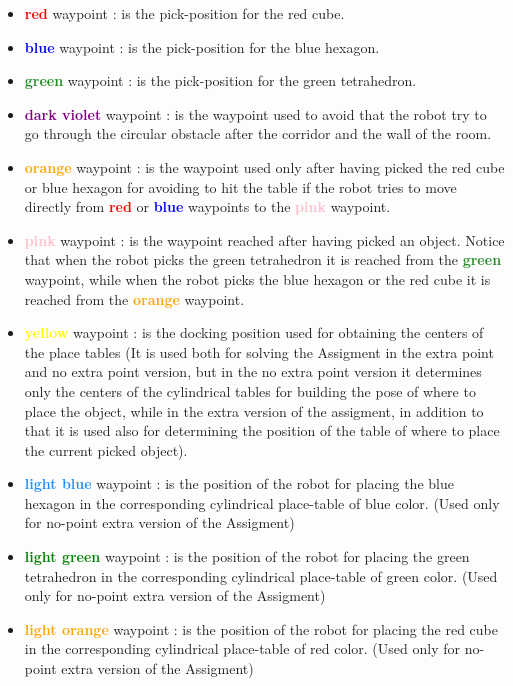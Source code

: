 \begin{itemize}
    \item \textbf{\textcolor{red}{red}} waypoint : is the pick-position for the red cube.
    \item \textbf{\textcolor{blue}{blue}} waypoint : is the pick-position for the blue hexagon.
        \item \textbf{\textcolor{ForestGreen}{green}} waypoint : is the pick-position for the green tetrahedron.
    \item \textbf{\textcolor{Purple}{dark violet}} waypoint : is the waypoint used to avoid that the robot try to go through the circular obstacle after the corridor and the wall of the room.
    \item \textbf{\textcolor{orange}{orange}} waypoint : is the waypoint used only after having picked the red cube or blue hexagon for avoiding to hit the table if the robot tries to move directly from \textbf{\textcolor{red}{red}} or \textbf{\textcolor{blue}{blue}} waypoints to the \textbf{\textcolor{pink}{pink}} waypoint.
    \item \textbf{\textcolor{pink}{pink}} waypoint : is the waypoint reached after having picked an object. Notice that when the robot picks the green tetrahedron it is reached from the \textbf{\textcolor{ForestGreen}{green}} waypoint, while when the robot picks the blue hexagon or the red cube it is reached from the \textbf{\textcolor{orange}{orange}} waypoint.
    \item \textbf{\textcolor{yellow}{yellow}} waypoint : is the docking position used for obtaining the centers of the place tables (It is used both for solving the Assigment in the extra point and no extra point version, but in the no extra point version it determines only the centers of the cylindrical tables for building the pose of where to place the object, while in the extra version of the assigment, in addition to that it is used also for determining the position of the table of where to place the current picked object).
    \item \textbf{\textcolor{DodgerBlue}{light blue}} waypoint : is the position of the robot for placing the blue hexagon in the corresponding cylindrical place-table of blue color. (Used only for no-point extra version of the Assigment)
    \item \textbf{\textcolor{green}{light green}} waypoint : is the position of the robot for placing the green tetrahedron in the corresponding cylindrical place-table of green color. (Used only for no-point extra version of the Assigment)
    \item \textbf{\textcolor{Orange}{light orange}} waypoint : is the position of the robot for placing the red cube in the corresponding cylindrical place-table of red color. (Used only for no-point extra version of the Assigment)
\end{itemize}

